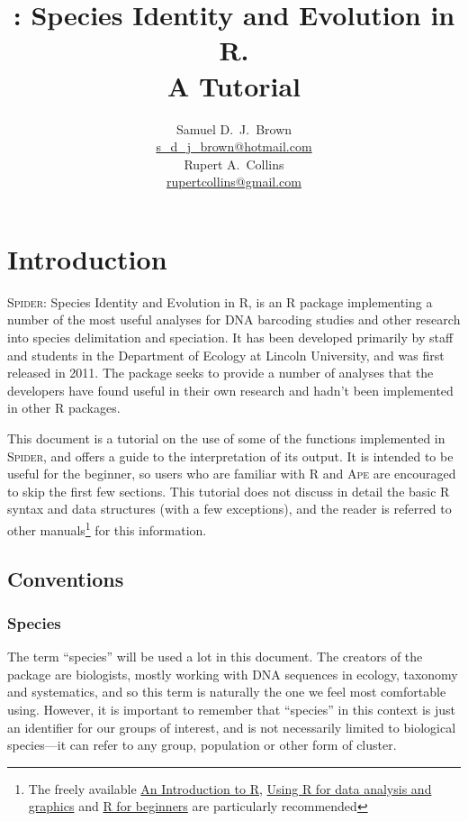 \documentclass{article}
\title{\Spider: Species Identity and Evolution in R.\\ A Tutorial}
\author{Samuel D.\ J.\ Brown\\\href{mailto:s_d_j_brown@hotmail.com}
{s\_d\_j\_brown@hotmail.com}\\Rupert A.\ Collins\\\href{mailto:rupertcollins@gmail.com}{rupertcollins@gmail.com}}
\newcommand{\Spider}{\textsc{Spider}} %
\newcommand{\progname}[1]{\textsc{#1}}
\begin{document}


\maketitle


\section{Introduction}
\Spider: Species Identity and Evolution in R, is an \progname{R} package implementing a number of the most useful analyses for DNA barcoding studies and other research into species delimitation and speciation. It has been developed primarily by staff and students in the Department of Ecology at Lincoln University, and was first released in 2011. The package seeks to provide a number of analyses that the developers have found useful in their own research and hadn't been implemented in other \progname{R} packages. 

This document is a tutorial on the use of some of the functions implemented in \Spider, and offers a guide to the interpretation of its output. It is intended to be useful for the beginner, so users who are familiar with \progname{R} and \progname{Ape} are encouraged to skip the first few sections. This tutorial does not discuss in detail the basic \progname{R} syntax and data structures (with a few exceptions), and the reader is referred to other manuals\footnote{The freely available \href{http://cran.r-project.org/doc/manuals/R-intro.pdf}{An Introduction to R}, \href{http://cran.r-project.org/doc/contrib/usingR.pdf}{Using R for data analysis and graphics} and \href{http://cran.r-project.org/doc/contrib/Paradis-rdebuts_en.pdf}{R for beginners} are particularly recommended} for this information.

\subsection{Conventions}

\subsubsection{Species}
\label{speciesDef}
The term ``species'' will be used a lot in this document. The creators of the package are biologists, mostly working with DNA sequences in ecology, taxonomy and systematics, and so this term is naturally the one we feel most comfortable using. However, it is important to remember that ``species'' in this context is just an identifier for our groups of interest, and is not necessarily limited to biological species---it can	refer to any group, population or other form of cluster. 
\end{document}
